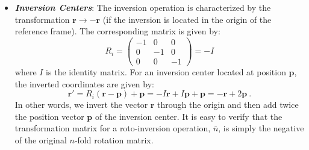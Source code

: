 \begin{itemize}
\begin{equation*}
\begin{split}
		\begin{pmatrix}1&0&0\\ 0&\frac{1}{\sqrt{2}}&\frac{1}{\sqrt{2}}\\ 0&-\frac{1}{\sqrt{2}}&\frac{1}{\sqrt{2}}\end{pmatrix}
		= \begin{pmatrix}1&0&0\\ 0&0&1\\ 0&1&0\end{pmatrix}
\end{split}
\end{equation*}
In terms of the coordinates $(x,y,z)$ this inclined mirror plane swaps the $y$ and $z$ coordinates, as is readily verified using a simple sketch.
	
	\item \textbf{\textit{Inversion Centers}}: The inversion operation is characterized by the transformation $\mathbf{r}\rightarrow -\mathbf{r}$ (if the inversion is located in the origin of the reference frame).  The corresponding matrix is given by:
	\[
	R_i = \begin{pmatrix}-1&0&0\\ 0&-1&0\\ 0&0&-1\end{pmatrix} = -I
\]
where $I$ is the identity matrix.  For an inversion center located at position $\mathbf{p}$, the inverted coordinates are given by:
\[
	\mathbf{r}' = R_i (\mathbf{r}-\mathbf{p}) + \mathbf{p} = -I\mathbf{r}+I\mathbf{p}+\mathbf{p} = -\mathbf{r}+2\mathbf{p}\ .
\]
In other words, we invert the vector $\mathbf{r}$ through the origin and then add twice the position vector $\mathbf{p} $ of the inversion center.  It is easy to verify that the transformation matrix for a roto-inversion operation, $\bar{n}$, is simply the negative of the original $n$-fold rotation matrix.

\end{itemize}


